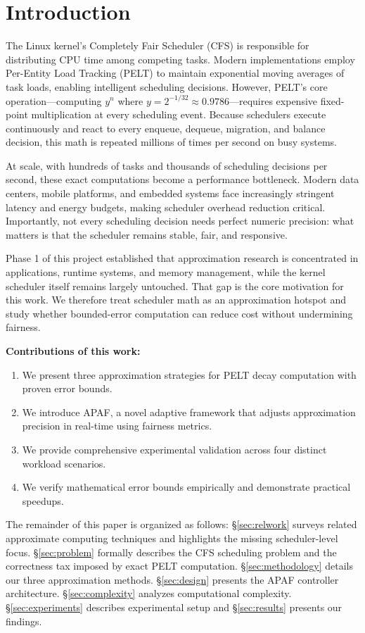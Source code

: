 \documentclass[conference]{IEEEtran}
\begin{document}
\section{Introduction}

The Linux kernel's Completely Fair Scheduler (CFS) is responsible for distributing CPU time among competing tasks. Modern implementations employ Per-Entity Load Tracking (PELT) to maintain exponential moving averages of task loads, enabling intelligent scheduling decisions. However, PELT's core operation---computing $y^n$ where $y = 2^{-1/32} \approx 0.9786$---requires expensive fixed-point multiplication at every scheduling event. Because schedulers execute continuously and react to every enqueue, dequeue, migration, and balance decision, this math is repeated millions of times per second on busy systems.

At scale, with hundreds of tasks and thousands of scheduling decisions per second, these exact computations become a performance bottleneck. Modern data centers, mobile platforms, and embedded systems face increasingly stringent latency and energy budgets, making scheduler overhead reduction critical. Importantly, not every scheduling decision needs perfect numeric precision: what matters is that the scheduler remains stable, fair, and responsive.

Phase 1 of this project established that approximation research is concentrated in applications, runtime systems, and memory management, while the kernel scheduler itself remains largely untouched. That gap is the core motivation for this work. We therefore treat scheduler math as an approximation hotspot and study whether bounded-error computation can reduce cost without undermining fairness.

\textbf{Contributions of this work:}
\begin{enumerate}
\item We present three approximation strategies for PELT decay computation with proven error bounds.
\item We introduce APAF, a novel adaptive framework that adjusts approximation precision in real-time using fairness metrics.
\item We provide comprehensive experimental validation across four distinct workload scenarios.
\item We verify mathematical error bounds empirically and demonstrate practical speedups.
\end{enumerate}

The remainder of this paper is organized as follows: \S\ref{sec:relwork} surveys related approximate computing techniques and highlights the missing scheduler-level focus. \S\ref{sec:problem} formally describes the CFS scheduling problem and the correctness tax imposed by exact PELT computation. \S\ref{sec:methodology} details our three approximation methods. \S\ref{sec:design} presents the APAF controller architecture. \S\ref{sec:complexity} analyzes computational complexity. \S\ref{sec:experiments} describes experimental setup and \S\ref{sec:results} presents our findings.
\end{document}
